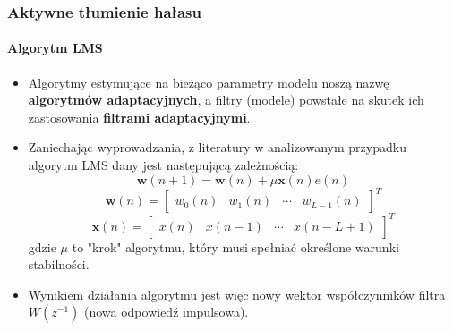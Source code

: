 \documentclass{beamer}
\begin{document}
        \begin{frame}
            \frametitle{Aktywne tłumienie hałasu}
            \framesubtitle{Algorytm LMS}
            \begin{itemize}
            \item Algorytmy estymujące na bieżąco parametry modelu noszą nazwę \textbf{algorytmów adaptacyjnych}, a filtry (modele) powstałe na skutek ich zastosowania \textbf{filtrami adaptacyjnymi}.
            \item Zaniechając wyprowadzania, z literatury w analizowanym przypadku algorytm LMS dany jest następującą zależnością:
            \begin{equation}
                \textbf{w}(n + 1) = \textbf{w}(n) + \mu \textbf{x}(n)e(n)
            \end{equation}
            \begin{equation}
                \textbf{w}(n) = \begin{bmatrix} w_0(n) & w_1(n) & \cdots & w_{L-1}(n) \end{bmatrix}^T
            \end{equation}
            \begin{equation}
                \textbf{x}(n) = \begin{bmatrix} x(n) & x(n - 1) & \cdots & x(n - L + 1) \end{bmatrix}^T
            \end{equation}
            gdzie $\mu$ to "krok" algorytmu, który musi spełniać określone warunki stabilności.
            \item Wynikiem działania algorytmu jest więc nowy wektor współczynników filtra $W(z^{-1})$ (nowa odpowiedź impulsowa).
            \end{itemize}
        \end{frame}
\end{document}
